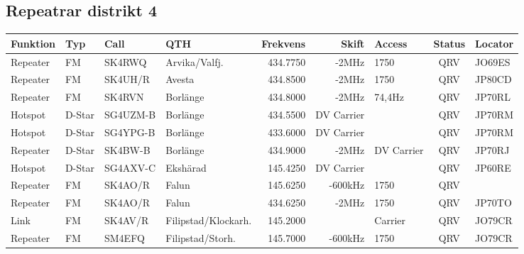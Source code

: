 \begin{landscape}
\subsection{Repeatrar distrikt 4}
\footnotesize
\begin{longtable}{llllrrlcl}
	\textbf{Funktion}  & \textbf{Typ} & \textbf{Call} & \textbf{QTH}        & \textbf{Frekvens} & \textbf{Skift} & \textbf{Access} & \textbf{Status} & \textbf{Locator} \\ \hline
	\endhead
	Repeater & FM           & SK4RWQ        & Arvika/Valfj.       &          434.7750 &          -2MHz & 1750            &       QRV       & JO69ES           \\
	Repeater           & FM           & SK4UH/R       & Avesta              &          434.8500 &          -2MHz & 1750            &       QRV       & JP80CD           \\
	Repeater           & FM           & SK4RVN        & Borlänge            &          434.8000 &          -2MHz & 74,4Hz          &       QRV       & JP70RL           \\
	Hotspot            & D-Star       & SG4UZM-B      & Borlänge            &          434.5500 &     DV Carrier &                 &       QRV       & JP70RM           \\
	Hotspot            & D-Star       & SG4YPG-B      & Borlänge            &          433.6000 &     DV Carrier &                 &       QRV       & JP70RM           \\
	Repeater           & D-Star       & SK4BW-B       & Borlänge            &          434.9000 &          -2MHz & DV Carrier      &       QRV       & JP70RJ           \\
	Hotspot            & D-Star       & SG4AXV-C      & Ekshärad            &          145.4250 &     DV Carrier &                 &       QRV       & JP60RE           \\
	Repeater           & FM           & SK4AO/R       & Falun               &          145.6250 &        -600kHz & 1750            &       QRV       &  \\
	Repeater           & FM           & SK4AO/R       & Falun               &          434.6250 &          -2MHz & 1750            &       QRV       & JP70TO           \\
	Link               & FM           & SK4AV/R       & Filipstad/Klockarh. &          145.2000 &                & Carrier         &       QRV       & JO79CR           \\
	Repeater           & FM           & SM4EFQ        & Filipstad/Storh.    &          145.7000 &        -600kHz & 1750            &       QRV       & JO79CR           \\

\end{longtable}
\end{landscape}
